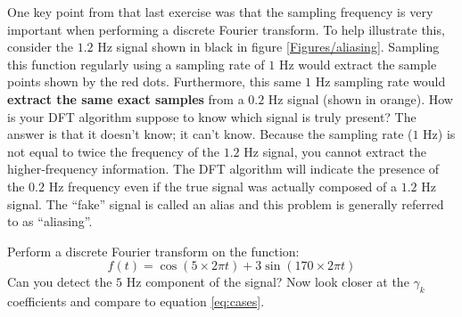 One key point from that last exercise was that the sampling frequency
is very important when performing a discrete Fourier transform.  To
help illustrate this, consider the $1.2$ Hz signal shown in black in
figure \ref{Figures/aliasing}.  Sampling this function regularly using
a sampling rate of $1$ Hz would extract the sample points shown by
the red dots.  Furthermore, this same $1$ Hz sampling rate would
\textbf{extract the same exact samples} from a $0.2$ Hz signal (shown
in orange). How is your DFT algorithm suppose to know which signal is
truly present?  The answer is that it doesn't know; it can't know.
Because the sampling rate ($1$ Hz) is not equal to twice the frequency
of the $1.2$ Hz signal, you cannot extract the higher-frequency
information.  The DFT algorithm will indicate the presence of the
$0.2$ Hz frequency even if the true signal was actually composed of a
$1.2$ Hz signal.  The ``fake'' signal is called an alias and this
problem is generally referred to as ``aliasing''.
\begin{enumerate}
\probtwo 
\begin{enumerate}
\subprob Perform a discrete Fourier transform on the function:
\begin{equation}
f(t) = \cos(5 \times 2 \pi t) + 3 \sin(170 \times 2 \pi t)
\end{equation}
Can you detect the $5$ Hz component of the signal?
\subprob Now look closer at the $\gamma_k$ coefficients and compare
to equation \ref{eq:cases}.  
\end{enumerate}
\end{enumerate}



